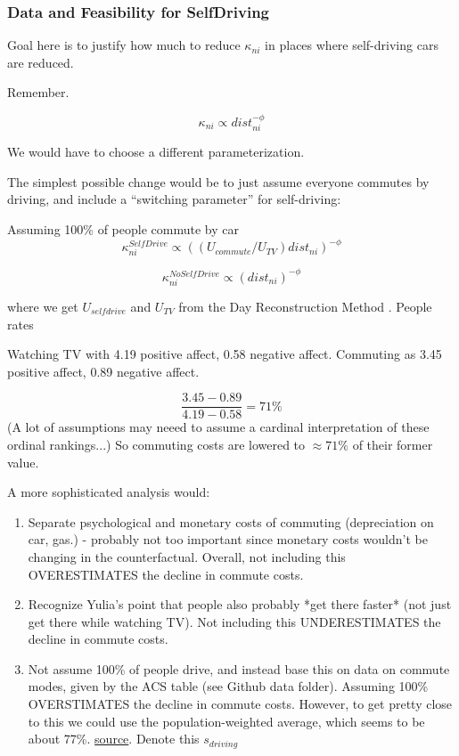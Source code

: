 \documentclass{article}
\begin{document}
\subsubsection{Data and Feasibility for SelfDriving}
Goal here is to justify how much to reduce $\kappa_{ni}$ in places where self-driving cars are reduced.

Remember.

$$\kappa_{ni} \propto dist_{ni}^{-\phi}$$

We would have to choose a different parameterization. 

The simplest possible change would be to just assume everyone commutes by driving, and include a ``switching parameter'' for self-driving:


Assuming 100\% of people commute by car
$$\kappa^{SelfDrive}_{ni} \propto ( (U_{commute}/U_{TV} )  dist_{ni} ) ^{-\phi}$$

$$\kappa^{NoSelfDrive}_{ni} \propto ( dist_{ni} ) ^{-\phi}$$

where we get $U_{self drive}$ and $U_{ TV}$ from the Day Reconstruction Method . People rates

Watching TV with 4.19 positive affect, 0.58 negative affect. Commuting as 3.45 positive affect, 0.89 negative affect.

$$\frac{3.45 - 0.89}{ 4.19-0.58} = 71\%$$
(A lot of assumptions may neeed to assume a cardinal interpretation of these ordinal rankings...)
So commuting costs are lowered to  $\approx 71\%$ of their former value.

A more sophisticated analysis would:

\begin{enumerate}
\item Separate psychological and monetary costs of commuting (depreciation on car, gas.) - probably not too important since monetary costs wouldn't be changing in the counterfactual. Overall, not including this OVERESTIMATES the decline in commute costs. 
\item Recognize Yulia's point that people also probably *get there faster* (not just get there while watching TV). Not including this UNDERESTIMATES the decline in commute costs. 
\item Not assume 100\% of people drive, and instead base this on data on commute modes, given by the ACS table (see Github data folder). Assuming 100\% OVERSTIMATES the decline in commute costs. However, to get pretty close to this we could use the population-weighted average, which seems to be about 77\%. \href{https://www2.census.gov/library/publications/2024/demo/acsbr-018.pdf}{source}. Denote this $s_{driving}$
\end{enumerate}
\end{document}
